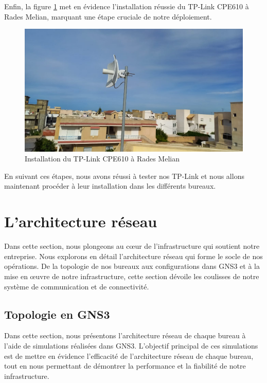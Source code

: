 Enfin, la figure \ref{Chap2.3.12} met en évidence l'installation réussie du TP-Link CPE610 à Rades Melian, marquant une étape cruciale de notre déploiement.

\begin{figure}[H]
\centering
\includegraphics[width=15cm]{Images/BRadesMelian-TPLinkCEP610-1.jpeg}
\caption{Installation du TP-Link CPE610 à Rades Melian}
\label{Chap2.3.12}
\end{figure}

En suivant ces étapes, nous avons réussi à tester nos TP-Link et nous allons maintenant procéder à leur installation dans les différents bureaux.

\section{L'architecture réseau}

Dans cette section, nous plongeons au cœur de l'infrastructure qui soutient notre entreprise. Nous explorons en détail l'architecture réseau qui forme le socle de nos opérations. De la topologie de nos bureaux aux configurations dans GNS3 et à la mise en œuvre de notre infrastructure, cette section dévoile les coulisses de notre système de communication et de connectivité.


\subsection{Topologie en GNS3}


Dans cette section, nous présentons l'architecture réseau de chaque bureau à l'aide de simulations réalisées dans GNS3. L'objectif principal de ces simulations est de mettre en évidence l'efficacité de l'architecture réseau de chaque bureau, tout en nous permettant de démontrer la performance et la fiabilité de notre infrastructure. 

